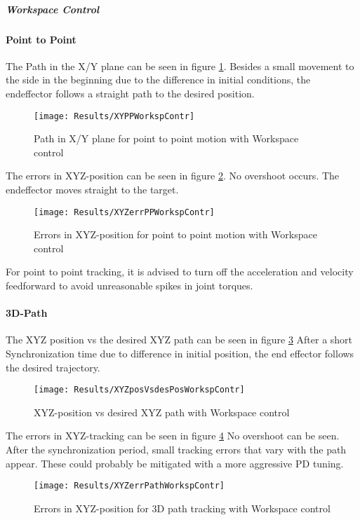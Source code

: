 \subparagraph{Workspace Control}

\paragraph{Point to Point}
The Path in the X/Y plane can be seen in figure  \ref{fig:XYPPWorkspContr}. 
Besides a small movement to the side in the beginning due to the difference in initial conditions, the endeffector follows a straight path to the desired position.
\begin{figure}[H]
	\texttt{[image: Results/XYPPWorkspContr]}
	\caption{Path in X/Y plane for point to point motion with Workspace control}
	\label{fig:XYPPWorkspContr}
\end{figure}
The errors in XYZ-position can be seen in figure \ref{fig:XYZerrPPWorkspContr}.
No overshoot occurs. The endeffector moves straight to the target.
\begin{figure}[H]
	\texttt{[image: Results/XYZerrPPWorkspContr]}
	\caption{Errors in XYZ-position for point to point motion with Workspace control}
	\label{fig:XYZerrPPWorkspContr}
\end{figure}

For point to point tracking, it is advised to turn off the acceleration and velocity feedforward to avoid unreasonable spikes in joint torques.

\paragraph{3D-Path}
The XYZ position vs the desired XYZ path can be seen in figure \ref{fig:XYZposVsdesPosWorkspContr}
After a short Synchronization time due to difference in initial position, the end effector follows the desired trajectory.
\begin{figure}[H]
	\texttt{[image: Results/XYZposVsdesPosWorkspContr]}
	\caption{XYZ-position vs desired XYZ path with Workspace control}
	\label{fig:XYZposVsdesPosWorkspContr}
\end{figure}
The errors in XYZ-tracking can be seen in figure \ref{fig:XYZerrPathWorkspContr}
No overshoot can be seen. After the synchronization period, small tracking errors that vary with the path appear. These could probably be mitigated with a more aggressive PD tuning.
\begin{figure}[H]
	\texttt{[image: Results/XYZerrPathWorkspContr]}
	\caption{Errors in XYZ-position for 3D path tracking with Workspace control}
	\label{fig:XYZerrPathWorkspContr}
\end{figure}


